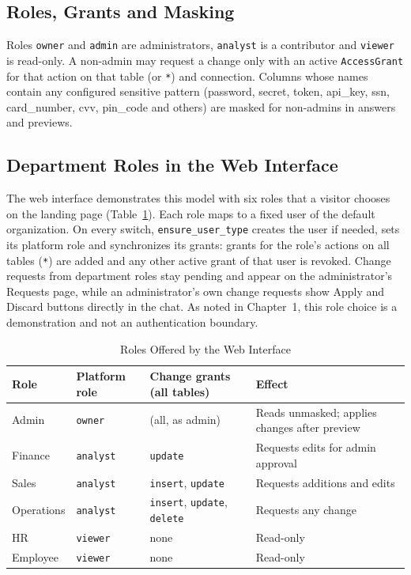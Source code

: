 \subsection{Roles, Grants and Masking}
Roles \texttt{owner} and \texttt{admin} are administrators, \texttt{analyst} is a
contributor and \texttt{viewer} is read-only. A non-admin may request a change only with an
active \texttt{AccessGrant} for that action on that table (or \texttt{*}) and connection.
Columns whose names contain any configured sensitive pattern (password, secret, token,
api\_key, ssn, card\_number, cvv, pin\_code and others) are masked for non-admins in answers
and previews.

\subsection{Department Roles in the Web Interface}
The web interface demonstrates this model with six roles that a visitor chooses on the
landing page (Table~\ref{tab:roles}). Each role maps to a fixed user of the default
organization. On every switch, \texttt{ensure\_user\_type} creates the user if needed, sets
its platform role and synchronizes its grants: grants for the role's actions on all tables
(\texttt{*}) are added and any other active grant of that user is revoked. Change requests
from department roles stay pending and appear on the administrator's Requests page, while an
administrator's own change requests show Apply and Discard buttons directly in the chat. As
noted in Chapter~1, this role choice is a demonstration and not an authentication boundary.

\begin{table}[H]
    \centering
    \small
    \caption{Roles Offered by the Web Interface}
    \begin{tabular}{p{2.4cm} p{2.4cm} p{4.4cm} p{5.2cm}}
        \toprule
        \textbf{Role} & \textbf{Platform role} & \textbf{Change grants (all tables)} & \textbf{Effect} \\
        \midrule
        Admin      & \texttt{owner}   & (all, as admin)                   & Reads unmasked; applies changes after preview \\[3pt]
        Finance    & \texttt{analyst} & \texttt{update}                   & Requests edits for admin approval \\[3pt]
        Sales      & \texttt{analyst} & \texttt{insert}, \texttt{update}  & Requests additions and edits \\[3pt]
        Operations & \texttt{analyst} & \texttt{insert}, \texttt{update}, \texttt{delete} & Requests any change \\[3pt]
        HR         & \texttt{viewer}  & none                              & Read-only \\[3pt]
        Employee   & \texttt{viewer}  & none                              & Read-only \\
        \bottomrule
    \end{tabular}
    \label{tab:roles}
\end{table}

